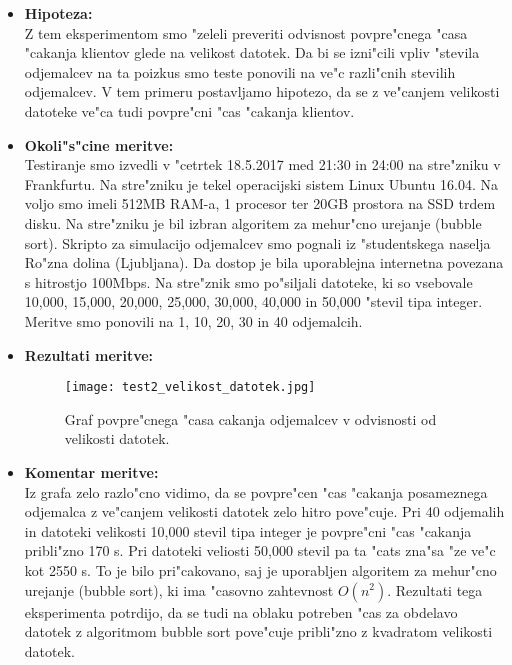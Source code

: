 \begin{itemize}
	\item \textbf{Hipoteza: }  \\
		Z tem eksperimentom smo "zeleli preveriti odvisnost povpre"cnega "casa "cakanja klientov glede na velikost datotek. Da bi se izni"cili vpliv "stevila odjemalcev na ta poizkus smo teste ponovili na ve"c razli"cnih stevilih odjemalcev.
V tem primeru postavljamo hipotezo, da se z ve"canjem velikosti datoteke ve"ca tudi povpre"cni "cas "cakanja klientov. 
			
	\item \textbf{Okoli"s"cine meritve: } \\
		Testiranje smo izvedli v "cetrtek 18.5.2017 med 21:30 in 24:00 na stre"zniku v Frankfurtu. Na stre"zniku je tekel operacijski sistem Linux Ubuntu 16.04. Na voljo smo imeli 512MB RAM-a, 1 procesor ter 20GB prostora na SSD trdem disku. Na stre"zniku je bil izbran algoritem za mehur"cno urejanje (bubble sort). Skripto za simulacijo odjemalcev smo pognali iz "studentskega naselja Ro"zna dolina (Ljubljana). Da dostop je bila uporablejna internetna povezana s hitrostjo 100Mbps. 
	 Na stre"znik smo po"siljali datoteke, ki so vsebovale 10,000, 15,000, 20,000, 25,000, 30,000, 40,000 in 50,000 "stevil tipa integer. Meritve smo ponovili na 1, 10, 20, 30 in 40 odjemalcih.  

 	\item \textbf{Rezultati meritve: }  \\
		\begin{figure}[!h]
  		\centering
  		  \texttt{[image: test2\_velikost\_datotek.jpg]}
  		\caption{Graf povpre"cnega "casa cakanja odjemalcev v odvisnosti od velikosti datotek.}		
  		\label{8_graf_st_odjemalcev}
		\end{figure}

	\item \textbf{Komentar meritve: } \\ 
		Iz grafa zelo razlo"cno vidimo, da se povpre"cen "cas "cakanja posameznega odjemalca z ve"canjem velikosti datotek zelo hitro pove"cuje. Pri 40 odjemalih in datoteki velikosti 10,000 stevil tipa integer je povpre"cni "cas "cakanja pribli"zno 170 s. Pri datoteki veliosti 50,000 stevil pa ta "cats zna"sa "ze ve"c kot 2550 s. To je bilo pri"cakovano, saj je uporabljen algoritem za mehur"cno urejanje (bubble sort), ki ima "casovno zahtevnost  $O(n^2)$. Rezultati tega eksperimenta potrdijo, da se tudi na oblaku potreben "cas za obdelavo datotek z algoritmom bubble sort pove"cuje pribli"zno z kvadratom velikosti datotek. 
		


\end{itemize}

